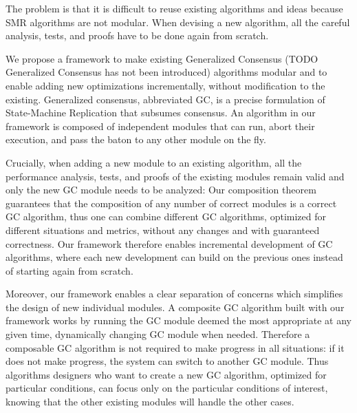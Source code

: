 The problem is that it is difficult to reuse existing algorithms and ideas because
SMR algorithms are not modular. When devising a new algorithm, all the careful
analysis, tests, and proofs have to be done again from scratch.


We propose a framework to make existing Generalized Consensus (TODO Generalized Consensus has not been introduced) algorithms modular
and to enable adding new optimizations incrementally, without modification to
the existing. Generalized consensus, abbreviated GC, is a precise formulation of
State-Machine Replication that subsumes consensus. An algorithm in our framework
is composed of independent modules that can run, abort their execution, and pass
the baton to any other module on the fly.

Crucially, when adding a new module to an existing algorithm, all the
performance analysis, tests, and proofs of the existing modules remain valid and
only the new GC module needs to be analyzed: Our composition theorem guarantees
that the composition of any number of correct modules is a correct GC algorithm,
thus one can combine different GC algorithms, optimized for different situations
and metrics, without any changes and with guaranteed correctness. Our framework
therefore enables incremental development of GC algorithms, where each new
development can build on the previous ones instead of starting again from
scratch.

Moreover, our framework enables a clear separation of concerns which simplifies
the design of new individual modules. A composite GC algorithm built with our
framework works by running the GC module deemed the most appropriate at any
given time, dynamically changing GC module when needed. Therefore a composable
GC algorithm is not required to make progress in all situations: if it does
not make progress, the system can switch to another GC module. Thus algorithms
designers who want to create a new GC algorithm, optimized for particular
conditions, can focus only on the particular conditions of interest, knowing
that the other existing modules will handle the other cases.

